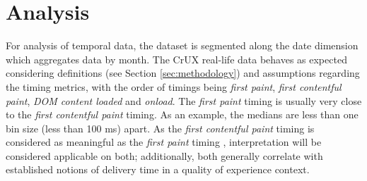 \section{Analysis}\label{sec:analysis}


For analysis of temporal data, the dataset is segmented along the date dimension which aggregates data by month.
The CrUX real-life data behaves as expected considering definitions (see Section \ref{sec:methodology}) and assumptions regarding the timing metrics, with the order of timings being \textit{first paint}, \textit{first contentful paint}, \textit{DOM content loaded} and \textit{onload}. The \textit{first paint} timing is usually very close to the \textit{first contentful paint} timing. As an example, the medians are less than one bin size (less than 100 ms) apart. %
As the \textit{first contentful paint} timing is considered as meaningful as the \textit{first paint} timing \cite{gtMet}%
, interpretation will be considered applicable on both; additionally, both generally correlate with established notions of delivery time in a quality of experience context. %



